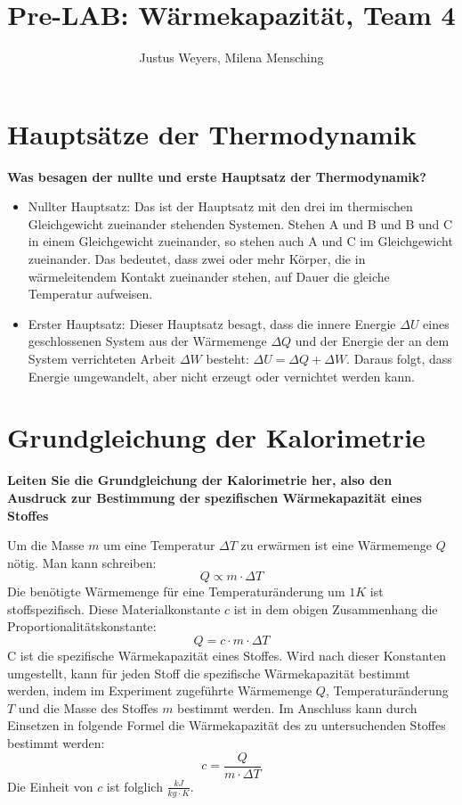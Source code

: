 \documentclass[a4paper, 12pt]{article}
\title{Pre-LAB: Wärmekapazität, Team 4}
\author{Justus Weyers, Milena Mensching}
\begin{document}
\maketitle
\section{Hauptsätze der Thermodynamik}
\textbf{Was besagen der nullte und erste Hauptsatz der Thermodynamik?}

\begin{itemize}
\item Nullter Hauptsatz: Das ist der Hauptsatz mit den drei im thermischen Gleichgewicht zueinander stehenden Systemen. Stehen A und B und B und C in einem Gleichgewicht zueinander, so stehen auch A und C im Gleichgewicht zueinander. Das bedeutet, dass zwei oder mehr Körper, die in wärmeleitendem Kontakt zueinander stehen, auf Dauer die gleiche Temperatur aufweisen.  
\item Erster Hauptsatz: Dieser Hauptsatz besagt, dass die innere Energie $\Delta U$ eines geschlossenen System aus der Wärmemenge $\Delta Q$ und der Energie der an dem System verrichteten Arbeit $\Delta W$ besteht: $\Delta U=\Delta Q + \Delta W$. Daraus folgt, dass Energie umgewandelt, aber nicht erzeugt oder vernichtet werden kann. 
\end{itemize}

\section{Grundgleichung der Kalorimetrie}
\textbf{Leiten Sie die Grundgleichung der Kalorimetrie her, also den Ausdruck zur Bestimmung
der spezifischen Wärmekapazität eines Stoffes}

Um die Masse $m$ um eine Temperatur $\Delta T$ zu erwärmen ist eine Wärmemenge $Q$ nötig. Man kann schreiben:
$$Q \propto m \cdot \Delta T$$
Die benötigte Wärmemenge für eine Temperaturänderung um $1K$ ist stoffspezifisch. Diese Materialkonstante $c$ ist in dem obigen Zusammenhang die Proportionalitätskonstante:
$$Q = c \cdot m \cdot \Delta T$$
C ist die spezifische Wärmekapazität eines Stoffes.
Wird nach dieser Konstanten umgestellt, kann für jeden Stoff die spezifische Wärmekapazität bestimmt werden, indem im Experiment zugeführte Wärmemenge $Q$, Temperaturänderung $T$ und die Masse des Stoffes $m$ bestimmt werden. Im Anschluss kann durch Einsetzen in folgende Formel die Wärmekapazität des zu untersuchenden Stoffes bestimmt werden:
$$c=\frac{Q}{m \cdot \Delta T}$$ 
Die Einheit von $c$ ist folglich $\frac{kJ}{kg \cdot K}$.
\end{document}
